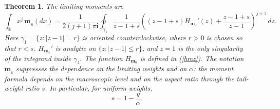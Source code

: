 \documentclass[11pt]{amsart}
\theoremstyle{plain}
\newtheorem{theorem}{Theorem}
\numberwithin{equation}{section}
\numberwithin{theorem}{section}
\numberwithin{figure}{section}
\begin{document}
\begin{theorem}
The limiting moments are
\[
\int_{\mathbb R}x^j\,\mathbf m_y(dx)
=
\frac{1}{2(j+1)\pi\mathbf i}
\oint_{\gamma_1}
\frac{1}{z-1+s}
\left(
 (z-1+s)H_{\mathbf m_0}'(z)
 +\frac{z-1+s}{z-1}
\right)^{j+1}
\,dz.
\]
Here $\gamma_1=\{z:|z-1|=r\}$ is oriented counterclockwise, where $r>0$ is
chosen so that $r<s$, $H_{\mathbf m_0}'$ is analytic on
$\{z:|z-1|\leq r\}$, and $z=1$ is the only singularity of the integrand inside
$\gamma_1$. The function $H_{\mathbf m_0}$ is defined in (\ref{hmz}). The
notation $\mathbf m_y$ suppresses the dependence on the limiting weights and on
$\alpha$: the moment formula depends on the macroscopic level and on the aspect
ratio through the tail-weight ratio $s$. In particular, for uniform weights,
\[
s=1-\frac{y}{\alpha}.
\]
\end{theorem}

\begingroup
\end{document}
